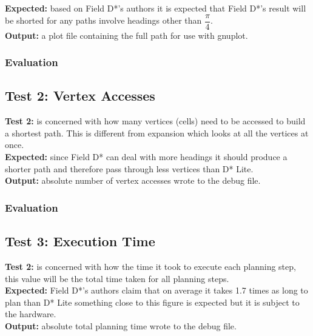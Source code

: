 \noindent
\textbf{Expected:} based on Field D*'s authors it is expected that Field D*'s result will be shorted for any paths involve headings other than $\dfrac{\pi}{4}$.\\

\noindent
\textbf{Output:} a plot file containing the full path for use with gnuplot.

\subsubsection{Evaluation}

\newpage

\subsection{Test 2: Vertex Accesses}

\noindent
\textbf{Test 2:} is concerned with how many vertices (cells) need to be accessed to build a shortest path. This is different from expansion which looks at all the vertices at once.\\

\noindent
\textbf{Expected:} since Field D* can deal with more headings it should produce a shorter path and therefore pass through less vertices than D* Lite.\\

\noindent
\textbf{Output:} absolute number of vertex accesses wrote to the debug file.

\subsubsection{Evaluation}

\newpage

\subsection{Test 3: Execution Time}

\noindent
\textbf{Test 2:} is concerned with how the time it took to execute each planning step, this value will be the total time taken for all planning steps.\\

\noindent
\textbf{Expected:} Field D*'s authors claim that on average it takes 1.7 times as long to plan than D* Lite something close to this figure is expected but it is subject to the hardware.\\

\noindent
\textbf{Output:} absolute total planning time wrote to the debug file.

